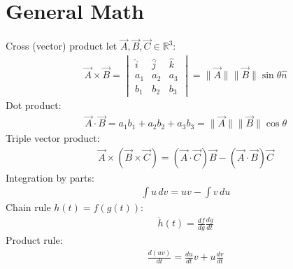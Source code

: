 \documentclass[conference]{IEEEtran}
\begin{document}
\section{General Math}
Cross (vector) product let $\vec{A}, \vec{B}, \vec{C} \in \mathbb{R}^3$:
\begin{align}
    & \vec{A} \times \vec{B} = \begin{vmatrix} \hat{i} & \hat{j} & \hat{k} \\ a_1 & a_2 & a_3 \\ b_1 & b_2 & b_3 \end{vmatrix} = \|\vec{A}\|\|\vec{B}\|\sin\theta \hat{n}
\end{align}
Dot product:
\begin{align}
    & \vec{A} \cdot \vec{B} = a_1b_1 + a_2 b_2 + a_3 b_3 = \|\vec{A}\|\|\vec{B}\|\cos\theta
\end{align}
Triple vector product:
\begin{align}
    & \vec{A} \times (\vec{B} \times \vec{C}) = (\vec{A} \cdot \vec{C}) \vec{B} - (\vec{A} \cdot \vec{B}) \vec{C} 
\end{align}
Integration by parts:
\begin{align}
    & \int u \, dv = uv - \int v \, du
\end{align}
Chain rule $h(t) = f(g(t))$:
\begin{align}
    & \dot{h}(t) = \frac{df}{dg}\frac{dg}{dt}
\end{align}
Product rule:
\begin{align}
    & \frac{d(uv)}{dt} = \frac{du}{dt}v + u\frac{dv}{dt}
\end{align}
\end{document}

